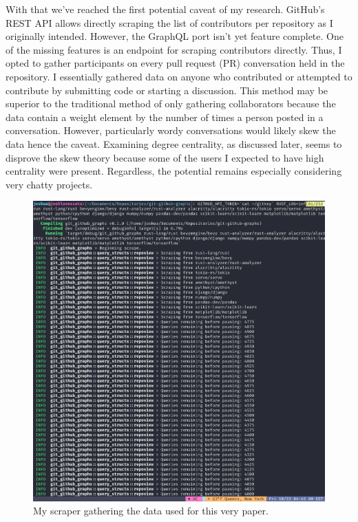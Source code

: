 \documentclass[12pt, a4paper]{article}
\begin{document}
With that we've reached the first potential caveat of my research. GitHub's REST API allows directly scraping the list of contributors per repository as I originally intended. However, the GraphQL port isn't yet feature complete. One of the missing features is an endpoint for scraping contributors directly. Thus, I opted to gather participants on every pull request (PR) conversation held in the repository. I essentially gathered data on anyone who contributed or attempted to contribute by submitting code or starting a discussion. This method may be superior to the traditional method of only gathering collaborators because the data contain a weight element by the number of times a person posted in a conversation. However, particularly wordy conversations would likely skew the data hence the caveat. Examining degree centrality, as discussed later, seems to disprove the skew theory because some of the users I expected to have high centrality were present. Regardless, the potential remains especially considering very chatty projects.

\begin{figure}[ht!]
    \includegraphics[width=\linewidth]{scraper.jpg}
    \caption{My scraper gathering the data used for this very paper.}
    \label{fig:scraper}
\end{figure}
\end{document}
